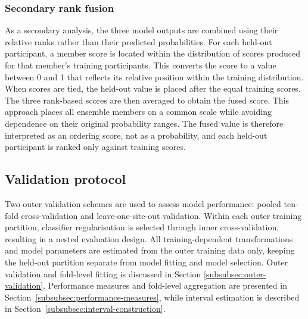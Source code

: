 \subsubsection{Secondary rank fusion}
\label{subsubsec:rank-fusion}

As a secondary analysis, the three model outputs are combined using their relative ranks rather than their predicted probabilities. For each held-out participant, a member score is located within the distribution of scores produced for that member's training participants. This converts the score to a value between 0 and 1 that reflects its relative position within the training distribution. When scores are tied, the held-out value is placed after the equal training scores. The three rank-based scores are then averaged to obtain the fused score. This approach places all ensemble members on a common scale while avoiding dependence on their original probability ranges. The fused value is therefore interpreted as an ordering score, not as a probability, and each held-out participant is ranked only against training scores.


\subsection{Validation protocol}
\label{subsec:validation-protocol}

Two outer validation schemes are used to assess model performance: pooled ten-fold cross-validation and leave-one-site-out validation. Within each outer training partition, classifier regularisation is selected through inner cross-validation, resulting in a nested evaluation design. All training-dependent transformations and model parameters are estimated from the outer training data only, keeping the held-out partition separate from model fitting and model selection. Outer validation and fold-level fitting is discussed in Section \ref{subsubsec:outer-validation}. Performance measures and fold-level aggregation are presented in Section~\ref{subsubsec:performance-measures}, while interval estimation is described in Section~\ref{subsubsec:interval-construction}.

